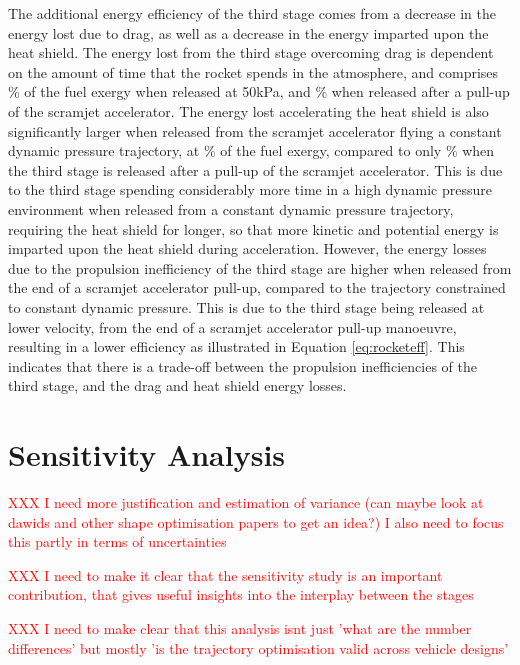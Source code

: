 The additional energy efficiency of the third stage comes from a decrease in the energy lost due to drag, as well as a decrease in the energy imparted upon the heat shield. 
The energy lost from the third stage overcoming drag is dependent on the amount of time that the rocket spends in the atmosphere, and comprises \WDthreeConstqNoReturn \% of the fuel exergy when released at 50kPa, and \WDthreeStandardNoReturn \% when released after a pull-up of the scramjet accelerator.
The energy lost accelerating the heat shield is also significantly larger when released from the scramjet accelerator flying a constant dynamic pressure trajectory, at \WHSthreeConstqNoReturn \% of the fuel exergy, compared to only \WHSthreeStandardNoReturn \% when the third stage is released after a pull-up of the scramjet accelerator. This is due to the third stage spending considerably more time in a high dynamic pressure environment when released from a constant dynamic pressure trajectory, requiring the heat shield for longer, so that more kinetic and potential energy is imparted upon the heat shield during acceleration. However, the energy losses due to the propulsion inefficiency of the third stage are higher when released from the end of a scramjet accelerator pull-up, compared to the trajectory constrained to constant dynamic pressure. This is due to the third stage being released at lower velocity, from the end of a scramjet accelerator pull-up manoeuvre, resulting in a lower efficiency as illustrated in Equation \ref{eq:rocketeff}. This indicates that there is a trade-off between the propulsion inefficiencies of the third stage, and the drag and heat shield energy losses.



 

  

\section{Sensitivity Analysis}\label{sec:sensitivityNoReturn}

\textcolor{red}{XXX I need more justification and estimation of variance (can maybe look at dawids and other shape optimisation papers to get an idea?) I also need to focus this partly in terms of uncertainties}

\textcolor{red}{XXX I need to make it clear that the sensitivity study is an important contribution, that gives useful insights into the interplay between the stages}

\textcolor{red}{XXX I need to make clear that this analysis isnt just 'what are the number differences' but mostly 'is the trajectory optimisation valid across vehicle designs'}



